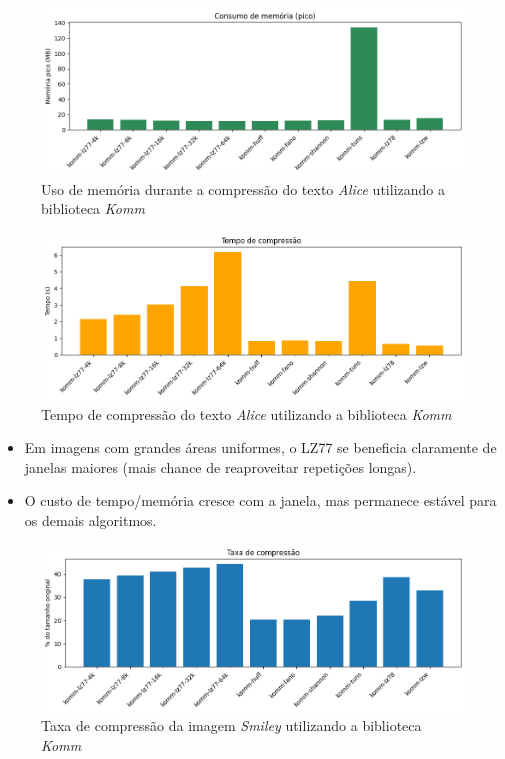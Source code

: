 \begin{figure}[h]
	\centering
	\caption{Uso de memória durante a compressão do texto \textit{Alice} utilizando a biblioteca \textit{Komm}}
	\label{fig:fig:komm-alice-memory}
	\includegraphics[width=15cm]{figuras/komm_alice_memory.png}
\end{figure}

\begin{figure}[h]
	\centering
	\caption{Tempo de compressão do texto \textit{Alice} utilizando a biblioteca \textit{Komm}}
	\label{fig:fig:komm-alice-time}
	\includegraphics[width=15cm]{figuras/komm_alice_time.png}
\end{figure}

\begin{itemize}
  \item Em imagens com grandes áreas uniformes, o LZ77 se beneficia claramente de janelas maiores (mais chance de reaproveitar repetições longas).
  \item O custo de tempo/memória cresce com a janela, mas permanece estável para os demais algoritmos.
\end{itemize}

\begin{figure}[h]
	\centering
	\caption{Taxa de compressão da imagem \textit{Smiley} utilizando a biblioteca \textit{Komm}}
	\label{fig:fig:komm-smiley-compression}
	\includegraphics[width=15cm]{figuras/komm_smiley_compression.png}
\end{figure}

